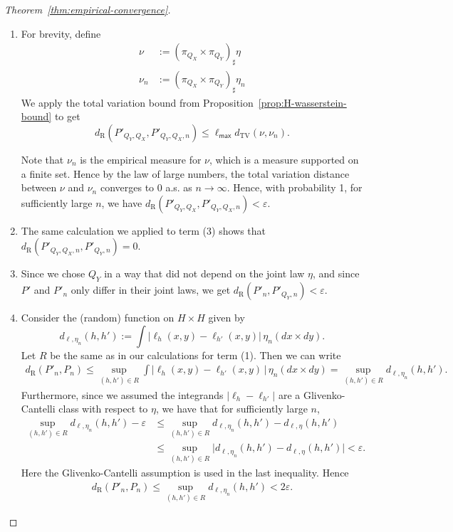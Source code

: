 \documentclass[twoside,11pt]{article}
\newcommand{\dexp}[1][]{d_{\mathrm{R}#1}}
\newcommand{\TV}{d_{\mathrm{TV}}}
\renewcommand{\epsilon}{\varepsilon}
\begin{document}
\begin{proof}[Theorem~\ref{thm:empirical-convergence}]
\begin{enumerate}[(1)]
    \item For brevity, define
    \begin{align*}
        \nu &:=(\pi_{Q_X}\times\pi_{Q_Y})_\sharp \eta
        \\
        \nu_n &:=(\pi_{Q_X}{\times}\pi_{Q_Y})_\sharp\eta_n
    \end{align*}
    We apply the total variation bound from Proposition~\ref{prop:H-wasserstein-bound} to get
    \[\dexp(P'_{Q_Y,Q_X},P'_{Q_Y,Q_X,n}) \leq \ell_{\mathsf{max}} \TV(\nu,\nu_n).\]
    
    Note that $\nu_n$ is the empirical measure for $\nu$, which is a measure supported on a finite set. Hence by the law of large numbers, the total variation distance between $\nu$ and $\nu_n$ converges to 0 a.s. as $n\to \infty$. Hence, with probability 1, for sufficiently large $n$, we have $\dexp(P'_{Q_Y,Q_X},P'_{Q_Y,Q_X,n}) < \epsilon$.

    \item The same calculation we applied to term (3) shows that $\dexp(P'_{Q_Y,Q_X,n},P'_{Q_Y,n}) = 0$.

    \item Since we chose $Q_Y$ in a way that did not depend on the joint law $\eta$, and since $P'$ and $P'_n$ only differ in their joint laws, we get $\dexp(P'_n,P'_{Q_Y,n})<\epsilon$.

    \item Consider the (random) function on $H\times H$ given by
    \[
        d_{\ell,\eta_n}(h,h') := \int \big|\ell_h(x,y) - \ell_{h'}(x,y)\big|\, \eta_n(dx{\times}dy).
    \]
    Let $R$ be the same as in our calculations for term (1). Then we can write
    \begin{align*}
        \dexp(P'_n,P_n) \leq \sup_{(h,h') \in R} \int \big|\ell_h(x,y) - \ell_{h'}(x,y)\, \big|\, \eta_n(dx\times dy) = \sup_{(h,h') \in R} d_{\ell,\eta_n}(h,h').
    \end{align*}
    Furthermore, since we assumed the integrands $|\ell_h - \ell_{h'}|$ are a Glivenko-Cantelli class with respect to $\eta$, we have that for sufficiently large $n$,
    \begin{align*}
        \sup_{(h,h') \in R} d_{\ell,\eta_n}(h,h') - \epsilon
        & \leq 
        \sup_{(h,h') \in R} d_{\ell,\eta_n}(h,h') - d_{\ell,\eta}(h,h')
        \\ & \leq
        \sup_{(h,h') \in R} \big| d_{\ell,\eta_n}(h,h') - d_{\ell,\eta}(h,h') \big|
        < \epsilon.
    \end{align*}
    Here the Glivenko-Cantelli assumption is used in the last inequality. Hence
    \begin{align*}
        \dexp(P'_n,P_n) \leq \sup_{(h,h') \in R} d_{\ell,\eta_n}(h,h') < 2\epsilon.
    \end{align*}
    \end{enumerate}


\end{proof}
\end{document}
